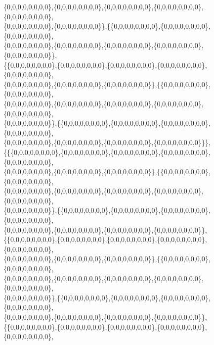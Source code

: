 \documentclass[a4paper,11pt]{jbook}
\theoremstyle{plain}
\theoremstyle{definition}
\theoremstyle{remark}
\theoremstyle{proof}
\numberwithin{equation}{section}
\begin{document}
\begin{doublespace}
\{0,0,0,0,0,0,0,0\},\{0,0,0,0,0,0,0,0\},\{0,0,0,0,0,0,0,0\},\{0,0,0,0,0,0,0,0\},\{0,0,0,0,0,0,0,0\}, \\
\{0,0,0,0,0,0,0,0\},\{0,0,0,0,0,0,0,0\}\},\{\{0,0,0,0,0,0,0,0\},\{0,0,0,0,0,0,0,0\},\{0,0,0,0,0,0,0,0\}, \\
\{0,0,0,0,0,0,0,0\},\{0,0,0,0,0,0,0,0\},\{0,0,0,0,0,0,0,0\},\{0,0,0,0,0,0,0,0\},\{0,0,0,0,0,0,0,0\}\}, \\
\{\{0,0,0,0,0,0,0,0\},\{0,0,0,0,0,0,0,0\},\{0,0,0,0,0,0,0,0\},\{0,0,0,0,0,0,0,0\},\{0,0,0,0,0,0,0,0\}, \\
\{0,0,0,0,0,0,0,0\},\{0,0,0,0,0,0,0,0\},\{0,0,0,0,0,0,0,0\}\},\{\{0,0,0,0,0,0,0,0\},\{0,0,0,0,0,0,0,0\}, \\
\{0,0,0,0,0,0,0,0\},\{0,0,0,0,0,0,0,0\},\{0,0,0,0,0,0,0,0\},\{0,0,0,0,0,0,0,0\},\{0,0,0,0,0,0,0,0\},\\
\{0,0,0,0,0,0,0,0\}\},\{\{0,0,0,0,0,0,0,0\},\{0,0,0,0,0,0,0,0\},\{0,0,0,0,0,0,0,0\},\{0,0,0,0,0,0,0,0\}, \\
\{0,0,0,0,0,0,0,0\},\{0,0,0,0,0,0,0,0\},\{0,0,0,0,0,0,0,0\},\{0,0,0,0,0,0,0,0\}\}\}, \\
\{\{\{0,0,0,0,0,0,0,0\},\{0,0,0,0,0,0,0,0\},\{0,0,0,0,0,0,0,0\},\{0,0,0,0,0,0,0,0\},\{0,0,0,0,0,0,0,0\}, \\
\{0,0,0,0,0,0,0,0\},\{0,0,0,0,0,0,0,0\},\{0,0,0,0,0,0,0,0\}\},\{\{0,0,0,0,0,0,0,0\},\{0,0,0,0,0,0,0,0\}, \\
\{0,0,0,0,0,0,0,0\},\{0,0,0,0,0,0,0,0\},\{0,0,0,0,0,0,0,0\},\{0,0,0,0,0,0,0,0\},\{0,0,0,0,0,0,0,0\},\\
\{0,0,0,0,0,0,0,0\}\},\{\{0,0,0,0,0,0,0,0\},\{0,0,0,0,0,0,0,0\},\{0,0,0,0,0,0,0,0\},\{0,0,0,0,0,0,0,0\}, \\
\{0,0,0,0,0,0,0,0\},\{0,0,0,0,0,0,0,0\},\{0,0,0,0,0,0,0,0\},\{0,0,0,0,0,0,0,0\}\}, \\
\{\{0,0,0,0,0,0,0,0\},\{0,0,0,0,0,0,0,0\},\{0,0,0,0,0,0,0,0\},\{0,0,0,0,0,0,0,0\},\{0,0,0,0,0,0,0,0\}, \\
\{0,0,0,0,0,0,0,0\},\{0,0,0,0,0,0,0,0\},\{0,0,0,0,0,0,0,0\}\},\{\{0,0,0,0,0,0,0,0\},\{0,0,0,0,0,0,0,0\}, \\
\{0,0,0,0,0,0,0,0\},\{0,0,0,0,0,0,0,0\},\{0,0,0,0,0,0,0,0\},\{0,0,0,0,0,0,0,0\},\{0,0,0,0,0,0,0,0\},\\
\{0,0,0,0,0,0,0,0\}\},\{\{0,0,0,0,0,0,0,0\},\{0,0,0,0,0,0,0,0\},\{0,0,0,0,0,0,0,0\},\{0,0,0,0,0,0,0,0\}, \\
\{0,0,0,0,0,0,0,0\},\{0,0,0,0,0,0,0,0\},\{0,0,0,0,0,0,0,0\},\{0,0,0,0,0,0,0,0\}\}, \\
\{\{0,0,0,0,0,0,0,0\},\{0,0,0,0,0,0,0,0\},\{0,0,0,0,0,0,0,0\},\{0,0,0,0,0,0,0,0\},\{0,0,0,0,0,0,0,0\}, \\

\end{doublespace}
\end{document}
